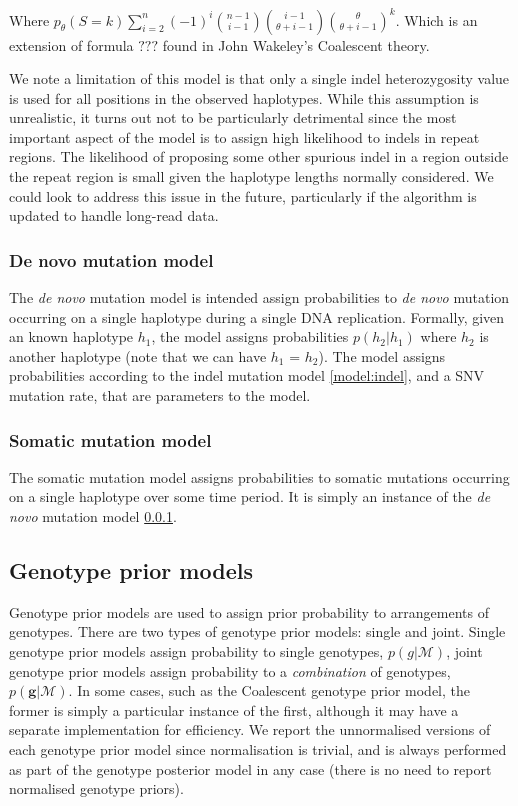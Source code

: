 \documentclass{article}
\begin{document}
Where $p_\theta(S = k)\sum_{i=2}^n (-1)^i \binom{n - 1}{i - 1} \binom{i - 1}{\theta + i - 1} \binom{\theta}{\theta + i - 1}^k$. Which is an extension of formula $???$ found in John Wakeley's Coalescent theory.

We note a limitation of this model is that only a single indel heterozygosity value is used for all positions in the observed haplotypes. While this assumption is unrealistic, it turns out not to be particularly detrimental since the most important aspect of the model is to assign high likelihood to indels in repeat regions. The likelihood of proposing some other spurious indel in a region outside the repeat region is small given the haplotype lengths normally considered. We could look to address this issue in the future, particularly if the algorithm is updated to handle long-read data.

\subsubsection{De novo mutation model} \label{model:denovo-mutation}

The \textit{de novo} mutation model is intended assign probabilities to \textit{de novo} mutation occurring on a single haplotype during a single DNA replication. Formally, given an known haplotype $h_1$, the model assigns probabilities $p(h_2 | h_1)$ where $h_2$ is another haplotype (note that we can have $h_1$ = $h_2$). The model assigns probabilities according to the indel mutation model \ref{model:indel}, and a SNV mutation rate, that are parameters to the model.

\subsubsection{Somatic mutation model}\label{model:somatic-mutation}

The somatic mutation model assigns probabilities to somatic mutations occurring on a single haplotype over some time period. It is simply an instance of the \textit{de novo} mutation model \ref{model:denovo-mutation}.

\subsection{Genotype prior models}

Genotype prior models are used to assign prior probability to arrangements of genotypes. There are two types of genotype prior models: single and joint. Single genotype prior models assign probability to single genotypes, $p(g | \mathcal{M})$, joint genotype prior models assign probability to a \emph{combination} of genotypes, $p(\boldsymbol{g} | \mathcal{M})$. In some cases, such as the Coalescent genotype prior model, the former is simply a particular instance of the first, although it may have a separate implementation for efficiency. We report the unnormalised versions of each genotype prior model since normalisation is trivial, and is always performed as part of the genotype posterior model in any case (there is no need to report normalised genotype priors).
\end{document}
